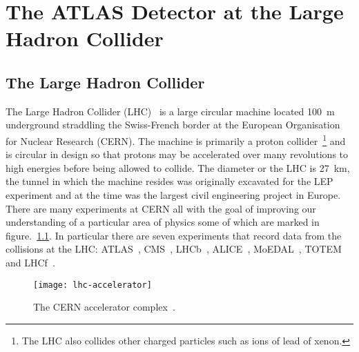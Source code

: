  \chapter{The ATLAS Detector at the Large Hadron Collider}%
\label{sec:detector}

\section{The Large Hadron Collider}%
\label{sec:lhc}%
The Large Hadron Collider (LHC)~\cite{LHC-dr} is a large circular machine
located 100~m underground straddling the Swiss-French border at the European
Organisation for Nuclear Research (CERN). The machine is primarily a proton
collider~\footnote{The LHC also collides other charged particles such as ions of
  lead of xenon.} and is circular in design so that protons may be accelerated
over many revolutions to high energies before being allowed to collide. The
diameter or the LHC is 27~km, the tunnel in which the machine resides was
originally excavated for the LEP~\cite{LEP} experiment and at the time was the
largest civil engineering project in Europe. There are many experiments at CERN
all with the goal of improving our understanding of a particular area of
physics some of which are marked in figure.~\ref{fig:lhc-acc}. In particular
there are seven experiments that record data from the collisions at the LHC:
ATLAS~\cite{ATLAS-loi}, CMS~\cite{CMS-loi}, LHCb~\cite{lhcb-loi},
ALICE~\cite{ALICE-loi}, MoEDAL~\cite{MoEDAL-loi}, TOTEM~\cite{TOTEM-loi} and
LHCf~\cite{lhcf-loi}.
\begin{figure}[h]
  \centering
  \texttt{[image: lhc-accelerator]}
  \caption[The CERN accelerator complex]{The CERN accelerator complex~\cite{LHC-acc-fig}.}%
  \label{fig:lhc-acc}
\end{figure}

